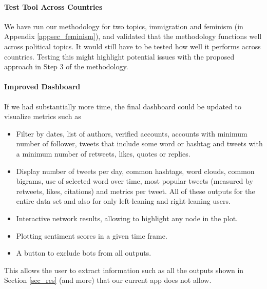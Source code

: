         
        \paragraph{Test Tool Across Countries}
        We have run our methodology for two topics, immigration and feminism (in Appendix \ref{appsec_feminism}), and validated that the methodology functions well across political topics. It would still have to be tested how well it performs across countries. Testing this might highlight potential issues with the proposed approach in Step 3 of the methodology.
        
        
        \paragraph{Improved Dashboard} If we had substantially more time, the final dashboard could be updated to visualize metrics such as
        \begin{itemize}
            \item 
            Filter by dates, list of authors, verified accounts, accounts with minimum number of follower, tweets that include some word or hashtag and tweets with a minimum number of retweets, likes, quotes or replies.
            
            \item 
            Display number of tweets per day, common hashtags, word clouds, common bigrams, use of selected word over time, most popular tweets (measured by retweets, likes, citations) and metrics per tweet. All of these outputs for the entire data set and also for only left-leaning and right-leaning users.
            
            \item 
            Interactive network results, allowing to highlight any node in the plot.
            
            \item
            Plotting sentiment scores in a given time frame.
            
            \item
            A button to exclude bots from all outputs.
        \end{itemize}
        This allows the user to extract information such as all the outputs shown in Section \ref{sec_res} (and more) that our current app does not allow. 
        
